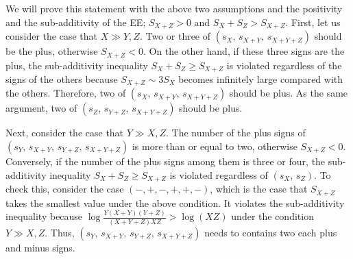 \documentclass[%
 reprint,
 amsmath,amssymb,
 aps,
]{revtex4-2}
\begin{document}
    We will prove this statement with the above two assumptions and the positivity and the sub-additivity of the EE; $S_{X+Z}>0$ and $S_X + S_Z > S_{X+Z}$. First, let us consider the case that $X \gg Y,Z$. Two or three of $(s_{X},\,s_{X+Y},\,s_{X+Y+Z})$ should be the plus, otherwise $S_{X+Z} < 0$. On the other hand, if these three signs are the plus, the sub-additivity inequality $S_{X} + S_{Z} \ge S_{X+Z}$ is violated regardless of the signs of the others because $S_{X+Z} \sim 3 S_X$ becomes infinitely large compared with the others. Therefore, two of $(s_{X},\,s_{X+Y},\,s_{X+Y+Z})$ should be plus. As the same argument, two of $(s_{Z},\,s_{Y+Z},\,s_{X+Y+Z})$ should be plus. 


    Next, consider the case that $Y \gg X,Z$. The number of the plus signs of $(s_{Y},\, s_{X+Y},\,s_{Y+Z},\,s_{X+Y+Z})$ is more than or equal to two, otherwise $S_{X+Z} < 0$. Conversely, if the number of the plus signs among them is three or four, the sub-additivity inequality $S_{X} + S_{Z} \ge S_{X+Z}$ is violated regardless of $(s_{X},\,s_{Z})$. To check this, consider the case $(-,+,-,+,+,-)$, which is the case that $S_{X+Z}$ takes the smallest value under the above condition. It violates the sub-additivity inequality because $\log \frac{Y(X+Y)(Y+Z)}{(X+Y+Z)XZ} > \log(XZ)$ under the condition $Y \gg X,Z$. Thus, $(s_{Y},\, s_{X+Y},\,s_{Y+Z},\,s_{X+Y+Z})$ needs to contains two each plus and minus signs.
\end{document}
